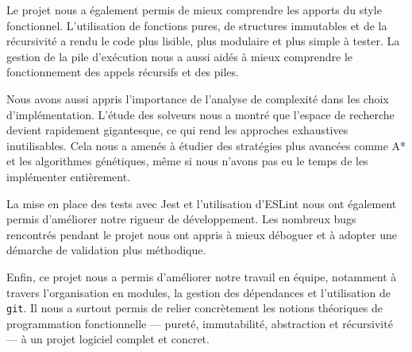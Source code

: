 \documentclass[12pt,a4paper]{article}
\begin{document}
Le projet nous a également permis de mieux comprendre les apports du style fonctionnel. L’utilisation de fonctions pures, de structures immutables et de la récursivité a rendu le code plus lisible, plus modulaire et plus simple à tester. La gestion de la pile d’exécution nous a aussi aidés à mieux comprendre le fonctionnement des appels récursifs et des piles.

Nous avons aussi appris l’importance de l’analyse de complexité dans les choix d’implémentation. L’étude des solveurs nous a montré que l’espace de recherche devient rapidement gigantesque, ce qui rend les approches exhaustives inutilisables. Cela nous a amenés à étudier des stratégies plus avancées comme A* et les algorithmes génétiques, même si nous n’avons pas eu le temps de les implémenter entièrement.

La mise en place des tests avec Jest et l’utilisation d’ESLint nous ont également permis d’améliorer notre rigueur de développement. Les nombreux bugs rencontrés pendant le projet nous ont appris à mieux déboguer et à adopter une démarche de validation plus méthodique.

Enfin, ce projet nous a permis d’améliorer notre travail en équipe, notamment à travers l’organisation en modules, la gestion des dépendances et l’utilisation de \texttt{git}. Il nous a surtout permis de relier concrètement les notions théoriques de programmation fonctionnelle — pureté, immutabilité, abstraction et récursivité — à un projet logiciel complet et concret.
\end{document}
